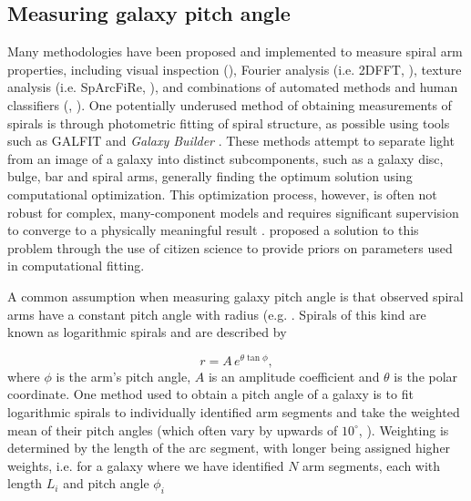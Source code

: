 \subsection{Measuring galaxy pitch angle}
Many methodologies have been proposed and implemented to measure spiral arm properties, including visual inspection (\citealt{2015A&A...582A..86H}), Fourier analysis (i.e. \textsc{2DFFT}, \citealt{2012ApJS..199...33D}), texture analysis (i.e. SpArcFiRe, \citealt{2014ApJ...790...87D}), and combinations of automated methods and human classifiers (\citealt{2017MNRAS.472.2263H}, \citealt{2020MNRAS.493.3854H}). One potentially underused method of obtaining measurements of spirals is through photometric fitting of spiral structure, as possible using tools such as \textsc{GALFIT} \citep{2010AJ....139.2097P} and \textit{Galaxy Builder} \citep{2020arXiv200610450L}. These methods attempt to separate light from an image of a galaxy into distinct subcomponents, such as a galaxy disc, bulge, bar and spiral arms, generally finding the optimum solution using computational optimization. This optimization process, however, is often not robust for complex, many-component models and requires significant supervision to converge to a physically meaningful result \citep{Gao2017:1709.00746v1}. \citet{2020arXiv200610450L} proposed a solution to this problem through the use of citizen science to provide priors on parameters used in computational fitting.

A common assumption when measuring galaxy pitch angle is that observed spiral arms have a constant pitch angle with radius (e.g. \citealt{2012ApJS..199...33D,2013MNRAS.436.1074S,2014ApJ...790...87D}. Spirals of this kind are known as logarithmic spirals and are described by

\begin{equation}
  \label{eq:log-spiral}
r = A\,e^{\theta\tan\phi},
\end{equation}
%
where $\phi$ is the arm's pitch angle, $A$ is an amplitude coefficient and $\theta$ is the polar coordinate. One method used to obtain a pitch angle of a galaxy is to fit logarithmic spirals to individually identified arm segments and take the weighted mean of their pitch angles (which often vary by upwards of $10^\circ$, \citealt{2014ApJ...790...87D}). Weighting is determined by the length of the arc segment, with longer being assigned higher weights, i.e. for a galaxy where we have identified $N$ arm segments, each with length $L_i$ and pitch angle $\phi_i$

